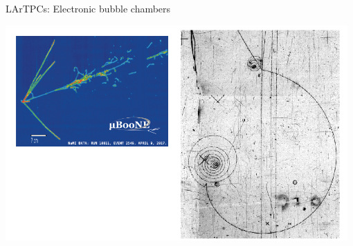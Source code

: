 \begin{frame}{LArTPCs: Electronic bubble chambers}

\begin{center}
  \includegraphics[width=0.98\textwidth]{./images/3nu/future/lartpc_5}\\
\end{center}

\end{frame}


